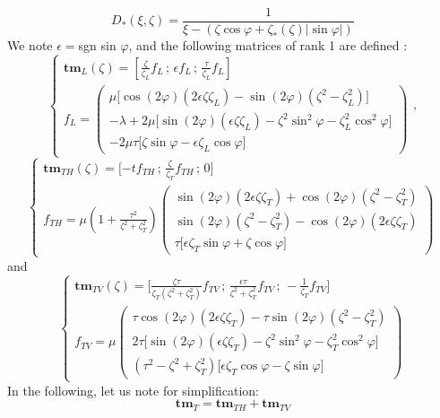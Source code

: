 \begin{equation}
D_*(\xi,\zeta)=\frac{1}{\xi-(\zeta \cos \varphi + \zeta_*(\zeta) |\sin \varphi|)}
\label{C4:defDstar}
\end{equation}
We note $\epsilon=$sgn sin $\varphi$, and the following matrices of rank 1 are defined :
\begin{equation}
\left\{
\begin{matrix}
\textbf{tm}_L(\zeta)=\left[ \frac{\zeta}{\zeta_L} f_L\,; \, \epsilon f_L\,;  \, \frac{\tau}{\zeta_L}f_L
\right] \\
f_L = \begin{pmatrix}
\mu \lbrack \cos(2\varphi)(2\epsilon\zeta\zeta_L)-\sin(2\varphi)(\zeta^2-\zeta_L^2) \rbrack\\
-\lambda+2\mu \lbrack \sin(2\varphi)(\epsilon\zeta\zeta_L)-\zeta^2\sin^2\varphi-\zeta^2_L\cos^2\varphi\rbrack\\
-2\mu\tau\lbrack \zeta\sin\varphi -\epsilon\zeta_L\cos\varphi\rbrack
\end{pmatrix}
\end{matrix}
\right. ,
\label{C4:tmL}
\end{equation}
\begin{equation}
\left\{
\begin{matrix}
\textbf{tm}_{TH}(\zeta)=\lbrack -tf_{TH}\,;\, \frac{\zeta}{\zeta_T}f_{TH}\,;\, 0 \rbrack\\
f_{TH}=\mu\left(1+\frac{\tau^2}{\zeta^2+\zeta_T^2}\right) \begin{pmatrix}
\sin(2\varphi)(2\epsilon\zeta\zeta_T)+\cos(2\varphi)(\zeta^2-\zeta_T^2)\\
\sin(2\varphi)(\zeta^2-\zeta_T^2)-\cos(2\varphi)(2\epsilon\zeta\zeta_T)\\
\tau\lbrack \epsilon\zeta_T\sin\varphi+\zeta\cos\varphi\rbrack 
\end{pmatrix}
\end{matrix}
\right.
\label{C4:tmTH}
\end{equation}
and
\begin{equation}
\left\{
\begin{matrix}
\textbf{tm}_{TV}(\zeta)=\lbrack \frac{\zeta\tau}{\zeta_T(\zeta^2+\zeta_T^2)}f_{TV}\,;\, \frac{\epsilon\tau}{\zeta^2+\zeta_T^2}f_{TV}\,;\, -\frac{1}{\zeta_T}f_{TV} \rbrack\\
f_{TV}=\mu\begin{pmatrix}
\tau\cos(2\varphi)(2\epsilon\zeta\zeta_T)-\tau\sin(2\varphi)(\zeta^2-\zeta_T^2)\\
2\tau\lbrack \sin(2\varphi)(\epsilon\zeta\zeta_T)-\zeta^2\sin^2\varphi-\zeta_T^2\cos^2\varphi\rbrack\\
\left(\tau^2-\zeta^2+\zeta_T^2\right)\lbrack \epsilon\zeta_T\cos\varphi-\zeta\sin\varphi \rbrack
\end{pmatrix}
\end{matrix}
\right.
\label{C4:tmTV}
\end{equation}
In the following, let us note for simplification:
\begin{equation}
\mathbf{tm}_T=\mathbf{tm}_{TH}+\mathbf{tm}_{TV}
\end{equation}

